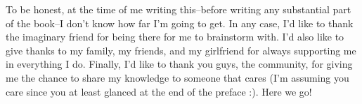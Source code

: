 \documentclass[../OpenAppliedMusicTheory.tex]{subfiles}
\begin{document}
    To be honest, at the time of me writing this--before writing any substantial part of the book--I don't know how far I'm going to get. In any case, I'd like to thank the imaginary friend for being there for me to brainstorm with. I'd also like to give thanks to my family, my friends, and my girlfriend for always supporting me in everything I do. Finally, I'd like to thank you guys, the community, for giving me the chance to share my knowledge to someone that cares (I'm assuming you care since you at least glanced at the end of the preface :). Here we go!
\end{document}
